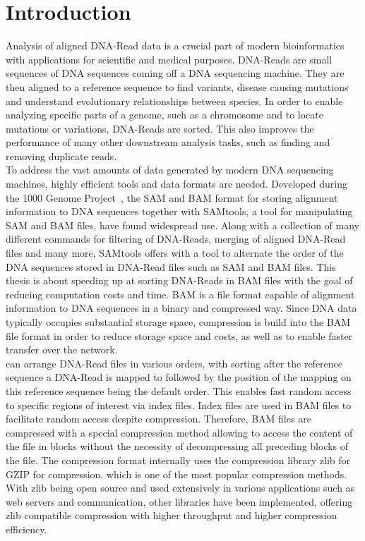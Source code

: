 \section{Introduction}
Analysis of aligned DNA-Read data is a crucial part of modern bioinformatics with applications for scientific and medical purposes. DNA-Reads are small sequences of DNA sequences coming off a DNA sequencing machine. They are then aligned to a reference sequence to find variants, disease causing mutations and understand evolutionary relationships between species. In order to enable analyzing specific parts of a genome, such as a chromosome and to locate mutations or variations, DNA-Reads are sorted. This also improves the performance of many other downstream analysis tasks, such as finding and removing duplicate reads. \\

To address the vast amounts of data generated by modern DNA sequencing machines, highly efficient tools and data formats are needed. Developed during the 1000 Genome Project~\cite{the_1000_genomes_project_consortium_1000_2012}, the SAM and BAM format for storing alignment information to DNA sequences together with SAMtools, a tool for manipulating SAM and BAM files, have found widespread use. Along with a collection of many different commands for filtering of DNA-Reads, merging of aligned DNA-Read files and many more, SAMtools offers with \sort a tool to alternate the order of the DNA sequences stored in DNA-Read files such as SAM and BAM files. This thesis is about speeding up \sort at sorting DNA-Reads in BAM files with the goal of reducing computation costs and time. BAM is a file format capable of alignment information to DNA sequences in a binary and compressed way. Since DNA data typically occupies substantial storage space, compression is build into the BAM file format in order to reduce storage space and costs, as well as to enable faster transfer over the network.\\

\sort can arrange DNA-Read files in various orders, with sorting after the reference sequence a DNA-Read is mapped to followed by the position of the mapping on this reference sequence being the default order. This enables fast random access to specific regions of interest via index files. Index files are used in BAM files to facilitate random access despite compression. Therefore, BAM files are compressed with a special compression method allowing to access the content of the file in blocks without the necessity of decompressing all preceding blocks of the file. The compression format internally uses the compression library zlib for GZIP for compression, which is one of the most popular compression methods. With zlib being open source and used extensively in various applications such as web servers and communication, other libraries have been implemented, offering zlib compatible compression with higher throughput and higher compression efficiency. \\

